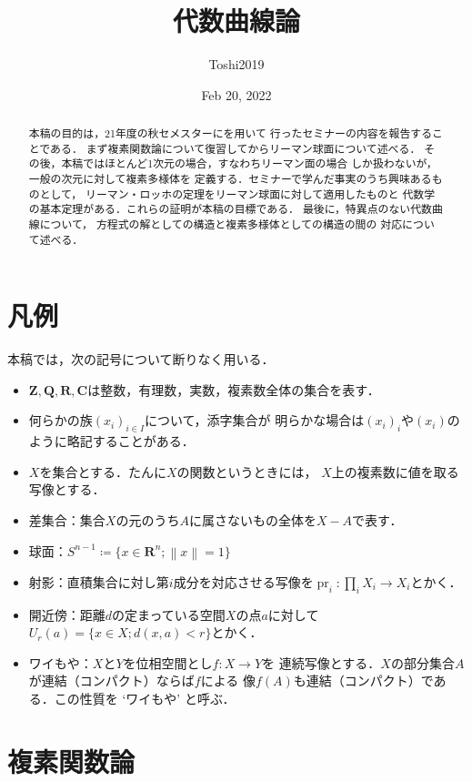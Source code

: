 \documentclass[11pt, a4paper, dvipdfmx, draft]{jsarticle}
\theoremstyle{definition}
\newcommand{\zz}{\mathbf{Z}}
\newcommand{\qq}{\mathbf{Q}}
\newcommand{\rr}{\mathbf{R}}
\newcommand{\cc}{\mathbf{C}}
\newcommand{\pr}{\mathop{\mathrm{pr}}\nolimits} %
\theoremstyle{mystyle}
\numberwithin{equation}{section} %
\begin{document}
\title{代数曲線論}
\author{Toshi2019}

\date{Feb 20, 2022}

\maketitle
\begin{abstract}
    本稿の目的は，21年度の秋セメスターに\cite{ogs}を用いて
    行ったセミナーの内容を報告することである．
    まず複素関数論について復習してからリーマン球面について述べる．
    その後，本稿ではほとんど1次元の場合，すなわちリーマン面の場合
    しか扱わないが，一般の次元に対して複素多様体を
    定義する．セミナーで学んだ事実のうち興味あるものとして，
    リーマン・ロッホの定理をリーマン球面に対して適用したものと
    代数学の基本定理がある．これらの証明が本稿の目標である．
    最後に，特異点のない代数曲線について，
    方程式の解としての構造と複素多様体としての構造の間の
    対応について述べる．
\end{abstract}

\section*{凡例}
本稿では，次の記号について断りなく用いる．

\begin{itemize}
    \item $\zz,\qq,\rr,\cc$は整数，有理数，実数，複素数全体の集合を表す．
    \item 何らかの族$(x_i)_{i\in I}$について，添字集合が
    明らかな場合は$(x_i)_{i}$や$(x_i)$のように略記することがある．
    \item $X$を集合とする．たんに$X$の関数というときには，
    $X$上の複素数に値を取る写像とする．
    \item 差集合：集合$X$の元のうち$A$に属さないもの全体を$X-A$で表す．
    \item 球面：$S^{n-1}\coloneqq \{x\in \rr^{n}; \left\|x\right\|=1\}$
    \item 射影：直積集合に対し第$i$成分を対応させる写像を$\pr_i\colon\prod_{i} X_i\to X_i$とかく．
    \item 開近傍：距離$d$の定まっている空間$X$の点$a$に対して$U_r(a)=\{x\in X; d(x,a)<r\}$とかく．
    \item ワイもや：$X$と$Y$を位相空間とし$f\colon X\to Y$を
    連続写像とする．$X$の部分集合$A$が連結（コンパクト）ならば$f$による
    像$f(A)$も連結（コンパクト）である．この性質を `ワイもや' と呼ぶ．
\end{itemize}
\section{複素関数論}
\end{document}
